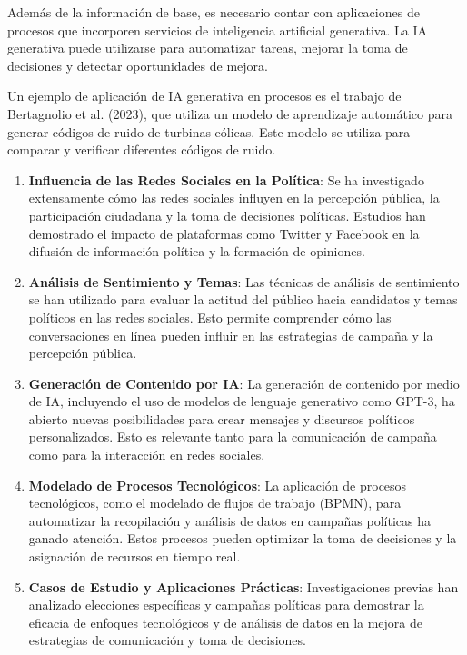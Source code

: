 \documentclass[12pt]{article}
\begin{document}
Además de la información de base, es necesario contar con aplicaciones de procesos que incorporen servicios de inteligencia artificial generativa. La IA generativa puede utilizarse para automatizar tareas, mejorar la toma de decisiones y detectar oportunidades de mejora.

Un ejemplo de aplicación de IA generativa en procesos es el trabajo de Bertagnolio et al. (2023), que utiliza un modelo de aprendizaje automático para generar códigos de ruido de turbinas eólicas. Este modelo se utiliza para comparar y verificar diferentes códigos de ruido.


\begin{enumerate}
\item \textbf{Influencia de las Redes Sociales en la Política}: Se ha investigado extensamente cómo las redes sociales influyen en la percepción pública, la participación ciudadana y la toma de decisiones políticas. Estudios han demostrado el impacto de plataformas como Twitter y Facebook en la difusión de información política y la formación de opiniones.

\item \textbf{Análisis de Sentimiento y Temas}: Las técnicas de análisis de sentimiento se han utilizado para evaluar la actitud del público hacia candidatos y temas políticos en las redes sociales. Esto permite comprender cómo las conversaciones en línea pueden influir en las estrategias de campaña y la percepción pública.

\item \textbf{Generación de Contenido por IA}: La generación de contenido por medio de IA, incluyendo el uso de modelos de lenguaje generativo como GPT-3, ha abierto nuevas posibilidades para crear mensajes y discursos políticos personalizados. Esto es relevante tanto para la comunicación de campaña como para la interacción en redes sociales.

\item \textbf{Modelado de Procesos Tecnológicos}: La aplicación de procesos tecnológicos, como el modelado de flujos de trabajo (BPMN), para automatizar la recopilación y análisis de datos en campañas políticas ha ganado atención. Estos procesos pueden optimizar la toma de decisiones y la asignación de recursos en tiempo real.

\item \textbf{Casos de Estudio y Aplicaciones Prácticas}: Investigaciones previas han analizado elecciones específicas y campañas políticas para demostrar la eficacia de enfoques tecnológicos y de análisis de datos en la mejora de estrategias de comunicación y toma de decisiones.
\end{enumerate}
\end{document}
